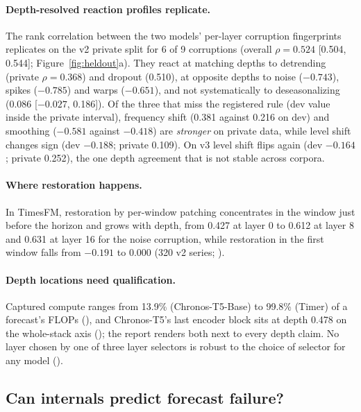 \paragraph{Depth-resolved reaction profiles replicate.} The rank correlation between the two models' per-layer corruption
fingerprints replicates on the v2 private split for 6 of 9 corruptions (overall $\rho=0.524$ [0.504, 0.544];
Figure~\ref{fig:heldout}a). They react at matching depths to detrending (private $\rho=0.368$) and dropout (0.510), at
opposite depths to noise ($-0.743$), spikes ($-0.785$) and warps ($-0.651$), and not systematically to deseasonalizing
(0.086 [$-0.027$, 0.186]). Of the three that miss the registered rule (dev value inside the private interval), frequency
shift (0.381 against 0.216 on dev) and smoothing ($-0.581$ against $-0.418$) are \emph{stronger} on private data, while
level shift changes sign (dev $-0.188$; private 0.109). On v3 level shift flips again (dev $-0.164$; private 0.252), the
one depth agreement that is not stable across corpora.

\paragraph{Where restoration happens.} In TimesFM, restoration by per-window patching concentrates in the window just
before the horizon and grows with depth, from 0.427 at layer 0 to 0.612 at layer 8 and 0.631 at layer 16 for the noise
corruption, while restoration in the first window falls from $-0.191$ to 0.000 (320 v2 series; ).

\paragraph{Depth locations need qualification.} Captured compute ranges from 13.9\% (Chronos-T5-Base) to 99.8\% (Timer)
of a forecast's FLOPs (), and Chronos-T5's last encoder block sits at depth 0.478 on the whole-stack axis
(); the report renders both next to every depth claim. No layer chosen by one of three layer selectors is
robust to the choice of selector for any model ().

\subsection{Can internals predict forecast failure?}
\label{sec:practical}


